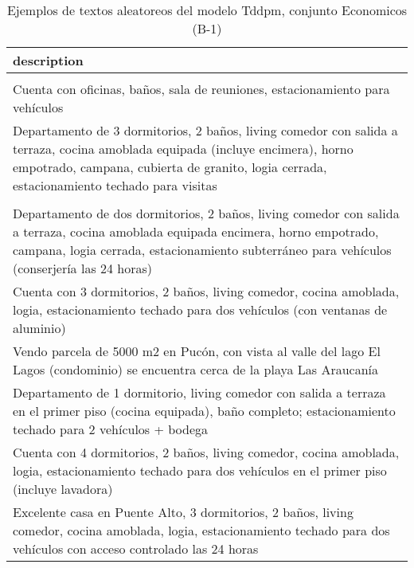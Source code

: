 \begin{table}[H]
\centering
\fontsize{8}{14}\selectfont
\caption{Ejemplos de textos aleatoreos del modelo Tddpm, conjunto Economicos (B-1)}
\label{table-sample10-economicos-b-1-tddpm_mlp-text}
\begin{tabular}{|m{50em}|}
\hline
\rowcolor[gray]{0.8}
description \\
\hline  \\
\hline Cuenta con oficinas, baños, sala de reuniones, estacionamiento para vehículos \\
\hline Departamento de 3 dormitorios, 2 baños, living comedor con salida a terraza, cocina amoblada equipada (incluye encimera), horno empotrado, campana, cubierta de granito, logia cerrada, estacionamiento techado para visitas \\
\hline  \\
\hline Departamento de dos dormitorios, 2 baños, living comedor con salida a terraza, cocina amoblada equipada encimera, horno empotrado, campana, logia cerrada, estacionamiento subterráneo para vehículos (conserjería las 24 horas) \\
\hline Cuenta con 3 dormitorios, 2 baños, living comedor, cocina amoblada, logia, estacionamiento techado para dos vehículos (con ventanas de aluminio) \\
\hline Vendo parcela de 5000 m2 en Pucón, con vista al valle del lago El Lagos (condominio) se encuentra cerca de la playa Las Araucanía \\
\hline Departamento de 1 dormitorio, living comedor con salida a terraza en el primer piso (cocina equipada), baño completo; estacionamiento techado para 2 vehículos + bodega \\
\hline Cuenta con 4 dormitorios, 2 baños, living comedor, cocina amoblada, logia, estacionamiento techado para dos vehículos en el primer piso (incluye lavadora) \\
\hline Excelente casa en Puente Alto, 3 dormitorios, 2 baños, living comedor, cocina amoblada, logia, estacionamiento techado para dos vehículos con acceso controlado las 24 horas \\
\hline
\end{tabular}
\end{table}
